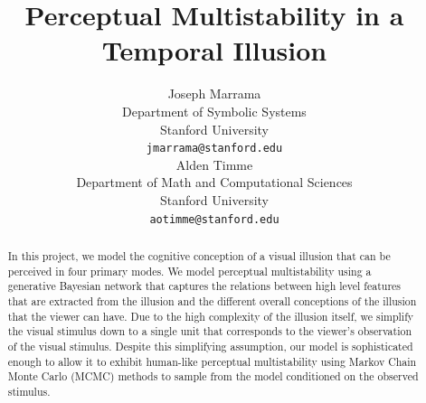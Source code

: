 \documentclass{article} %
\title{Perceptual Multistability in a Temporal Illusion}
\author{
Joseph Marrama \\
Department of Symbolic Systems\\
Stanford University\\
\texttt{jmarrama@stanford.edu} \\
\And
Alden Timme \\
Department of Math and Computational Sciences \\
Stanford University \\
\texttt{aotimme@stanford.edu} \\
}
\begin{document}
\maketitle

\begin{abstract}
In this project, we model the cognitive conception of a visual illusion that can be perceived in four primary modes. 
We model perceptual multistability using a generative Bayesian network that captures the relations between high level features that are extracted from the illusion and the different overall conceptions of the illusion that the viewer can have.
Due to the high complexity of the illusion itself, we simplify the visual stimulus down to a single unit that corresponds to the viewer's observation of the visual stimulus.
Despite this simplifying assumption, our model is sophisticated enough to allow it to exhibit human-like perceptual multistability using Markov Chain Monte Carlo (MCMC) methods to sample from the model conditioned on the observed stimulus.


\end{abstract}




\end{document}
